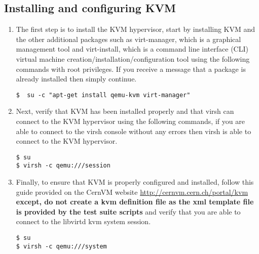 \subsection{Installing and configuring KVM}
\label{sec:debiankvm}
\begin{enumerate}
\item	The first step is to install the KVM hypervisor, start by installing KVM and the other additional packages such
		as virt-manager, which is a graphical management tool and virt-install, which is a command line interface (CLI)
		virtual machine creation/installation/configuration tool using the following commands with root privileges. If
		you receive a message that a package is already installed then simply continue.

\lstset{language=bash,caption=Installing KVM and Other Related Programs}
\begin{lstlisting}
$  su -c "apt-get install qemu-kvm virt-manager"
\end{lstlisting}

\item	Next, verify that KVM has been installed properly and that virsh can connect to the KVM hypervisor using the
		following commands, if you are able to connect to the virsh console without any errors then virsh is able
		to connect to the KVM hypervisor.

\lstset{language=bash,caption=Verify that virsh can Access KVM}
\begin{lstlisting}
$ su
$ virsh -c qemu:///session
\end{lstlisting}

\item 	Finally, to ensure that KVM is properly configured and installed, follow this guide provided on the CernVM website
		\url{http://cernvm.cern.ch/portal/kvm} {\bf except, do not create a kvm definition file as the xml template file
		is provided by the test suite scripts} and verify that you are able to connect to the libvirtd kvm system session.
		
\lstset{language=bash,caption=Verify that KVM is Properly Configured}
\begin{lstlisting}
$ su
$ virsh -c qemu:///system 
\end{lstlisting}
\end{enumerate}




